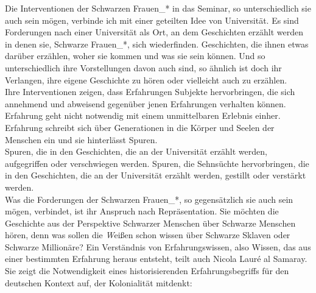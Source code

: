 Die Interventionen der Schwarzen Frauen\_* in das Seminar, so unterschiedlich sie
auch sein mögen, verbinde ich mit einer geteilten Idee von Universität. Es sind
Forderungen nach einer Universität als Ort, an dem Geschichten erzählt werden
in denen sie, Schwarze Frauen\_*, sich wiederfinden. Geschichten, die ihnen
etwas darüber erzählen, woher sie kommen und was sie sein können. Und so
unterschiedlich ihre Vorstellungen davon auch sind, so ähnlich ist doch ihr
Verlangen, ihre eigene Geschichte zu hören oder vielleicht auch zu erzählen.\\
Ihre Interventionen zeigen, dass Erfahrungen
Subjekte hervorbringen, die sich annehmend und abweisend gegenüber jenen
Erfahrungen verhalten können. Erfahrung geht nicht notwendig mit einem
unmittelbaren Erlebnis einher. Erfahrung schreibt sich über Generationen in die
Körper und Seelen der Menschen ein und sie hinterlässt Spuren.\\
Spuren, die in den Geschichten, die an der Universität erzählt werden,
aufgegriffen oder verschwiegen werden. Spuren, die Sehnsüchte hervorbringen,
die in den Geschichten, die an der Universität erzählt werden, gestillt oder
verstärkt werden.\\
Was die Forderungen der Schwarzen Frauen\_*, so gegensätzlich
sie auch sein mögen, verbindet, ist ihr Anspruch nach Repräsentation. Sie
möchten die Geschichte aus der Perspektive Schwarzer Menschen über Schwarze
Menschen hören, denn was sollen die \textit{W}eißen schon wissen über Schwarze Sklaven
oder Schwarze Millionäre?  Ein Verständnis von Erfahrungswissen, also Wissen,
das aus einer bestimmten Erfahrung heraus entsteht, teilt auch Nicola Lauré al
Samaray. Sie zeigt die Notwendigkeit eines historisierenden Erfahrungsbegriffs
für den deutschen Kontext auf, der Kolonialität mitdenkt:


